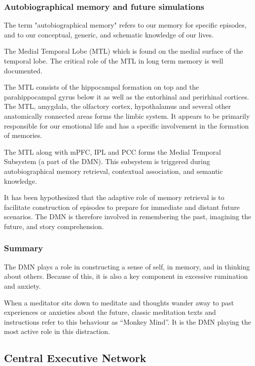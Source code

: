 \documentclass[a4paper, amsfonts, amssymb, amsmath, reprint, showkeys, nofootinbib, twoside]{revtex4-1}
\begin{document}
\subsubsection{Autobiographical memory and future simulations}

The term "autobiographical memory" refers to our memory for specific episodes, 
and to our conceptual, generic, and schematic knowledge of our lives.

The Medial Temporal Lobe (MTL) which is found on the medial surface of the temporal lobe. 
The critical role of the MTL in long term memory is well documented. \cite{mtl}

The MTL consists of the hippocampal formation on top and the parahippocampal gyrus below it as well as
the entorhinal and perirhinal cortices. 
The MTL, amygdala, the olfactory cortex, hypothalamus and several other 
anatomically connected areas forms the limbic system. It appears to be primarily responsible for
our emotional life and has a specific involvement in the formation of memories. \cite{limbic}

The MTL along with mPFC, IPL and PCC forms the Medial Temporal Subsystem (a part of the DMN). 
This subsystem is triggered during autobiographical memory retrieval,
contextual association, and semantic knowledge. \cite{defaultnetworkadaptive}

It has been hypothesized that the adaptive role of memory retrieval is to facilitate
construction of episodes to prepare for immediate and distant future scenarios. \cite{defaultnetworkadaptive}
The DMN is therefore involved in remembering the past, imagining the future, and story
comprehension. \cite{defaultnetworkadaptive}

\subsubsection{Summary}

The DMN plays a role in constructing a sense of self, in memory,
and in thinking about others. Because of this, it is also a key component in excessive
rumination and anxiety. \cite{dmndepression}

When a meditator sits down to meditate and thoughts wander away to past experiences
or anxieties about the future, classic meditation texts and instructions refer to
this behaviour as ``Monkey Mind''. It is the DMN playing the most active role in this
distraction.

\subsection{Central Executive Network}
\end{document}
